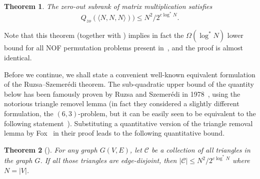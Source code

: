 \documentclass[10pt,a4paper]{article}
\newtheorem{theorem}{Theorem}
\newcommand{\cC}{\mathcal{C}}
\newcommand{\inprod}[1]{\langle #1 \rangle}
\newcommand{\jnote}[1]{\todo[inline, color=blue!30!white]{#1 \\ -\textsc{Jarek}}}
\newcommand{\joshnote}[1]{\todo[inline, color=red!30!white]{#1 \\ -\textsc{Josh}}}
\begin{document}
\begin{theorem}
\label{thm:subrank-triangle-lb}
The zero-out subrank of matrix multiplication satisfies
\begin{equation*}
    Q_{zo}(\inprod{N,N,N})) \leq N^{2}/2^{c \log^* N}.
\end{equation*}
\end{theorem}


Note that this theorem (together with ) implies in fact the $\Omega(\log^* N)$ lower bound for all NOF permutation problems present in~\cite{LPS17}, and the proof is almost identical.



Before we continue, we shall state a convenient well-known equivalent formulation of the Ruzsa–Szemerédi theorem. The sub-quadratic upper bound of the quantity below has been famously proven by Ruzsa and Szemerédi in 1978~\cite{RS78}, using the notorious triangle removel lemma (in fact they considered a slightly different formulation, the $(6,3)$-problem, but it can be easily seen to be equivalent to the following statement~\cite{CEMS91}). Substituting a quantitative version of the triangle removal lemma by Fox~\cite{F11} in their proof leads to the following quantitative bound.  
\begin{theorem}[\cite{RS78,CEMS91,F11}]
\label{thm:ruzsa-szemeredi}
    For any graph $G(V,E)$, let $\cC$ be a collection of all triangles in the graph $G$. If all those triangles are edge-disjoint, then $|\cC| \leq N^2/2^{c \log^* N}$ where $N = |V|$.
\end{theorem}
\end{document}
